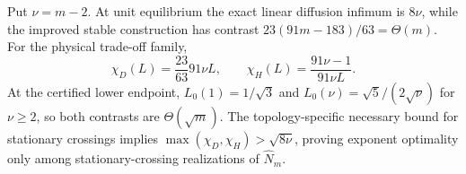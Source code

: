 Put $\nu=m-2$.  At unit equilibrium the exact linear diffusion infimum is
$8\nu$, while the improved stable construction has contrast
$23(91m-183)/63=\Theta(m)$.  For the physical trade-off family,
\[
 \chi_D(L)=\frac{23}{63}91\nu L,
 \qquad
 \chi_H(L)=\frac{91\nu-1}{91\nu L}.
\]
At the certified lower endpoint, $L_0(1)=1/\sqrt3$ and
$L_0(\nu)=\sqrt5/(2\sqrt\nu)$ for $\nu\ge2$, so both contrasts are
$\Theta(\sqrt m)$.  The topology-specific necessary bound for stationary
crossings implies $\max(\chi_D,\chi_H)>\sqrt{8\nu}$, proving exponent
optimality only among stationary-crossing realizations of $\widehat N_m$.
